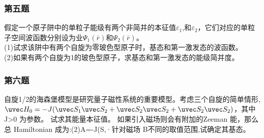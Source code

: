 \subsubsection{第五题}
假定一个原子阱中的单粒子能级有两个非简并的本征值$\varepsilon_1$,和$\varepsilon_2$，它们对应的单粒子空间波函数分别设为业$\Psi_1(\bar r)$和$\Psi_2(\bar r)$。\\
(1)试求该阱中有两个自旋为零玻色型原子时，基态和第一激发态的波函数。\\
(2)如果有两个自旋为1的玻色型原子，求基态和第一激发态的能级简并度。
\subsubsection{第六题}
自旋1/2的海森堡模型是研究量子磁性系统的重要模型。考虑三个自旋的简单情形,
$\uvec H_0=-J(\uvec S_1 \uvec S_2+\uvec S_2 \uvec S_2+\uvec S_2\uvec S_2)$，其中 J>0 为参数。
试求其能量本征值。
如果引入磁场则会有附加的Zeeman 能，那么总 Hamiltonian 成为:(2)A=-J(S,·针对磁场 B不同的取值范围,试确定其基态。
